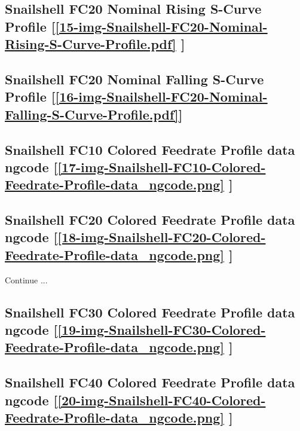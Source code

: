 \subsection     {Snailshell FC20 Nominal Rising S-Curve Profile
	[\ref      {15-img-Snailshell-FC20-Nominal-Rising-S-Curve-Profile.pdf} ] }
\label{ssec-15-img-Snailshell-FC20-Nominal-Rising-S-Curve-Profile.pdf}

\subsection     {Snailshell FC20 Nominal Falling S-Curve Profile
	[\ref      {16-img-Snailshell-FC20-Nominal-Falling-S-Curve-Profile.pdf}] }
\label{ssec-16-img-Snailshell-FC20-Nominal-Falling-S-Curve-Profile.pdf}

\subsection       {Snailshell FC10 Colored Feedrate Profile data ngcode
	[\ref      {17-img-Snailshell-FC10-Colored-Feedrate-Profile-data_ngcode.png} ] }
\label{ssec-17-img-Snailshell-FC10-Colored-Feedrate-Profile-data_ngcode.png}

\subsection       {Snailshell FC20 Colored Feedrate Profile data ngcode
	[\ref      {18-img-Snailshell-FC20-Colored-Feedrate-Profile-data_ngcode.png} ] }
\label{ssec-18-img-Snailshell-FC20-Colored-Feedrate-Profile-data_ngcode.png}

Continue ...\\

\subsection       {Snailshell FC30 Colored Feedrate Profile data ngcode
	[\ref      {19-img-Snailshell-FC30-Colored-Feedrate-Profile-data_ngcode.png} ] }
\label{ssec-19-img-Snailshell-FC30-Colored-Feedrate-Profile-data_ngcode.png}

\subsection       {Snailshell FC40 Colored Feedrate Profile data ngcode
	[\ref      {20-img-Snailshell-FC40-Colored-Feedrate-Profile-data_ngcode.png} ] }
\label{ssec-20-img-Snailshell-FC40-Colored-Feedrate-Profile-data_ngcode.png}

